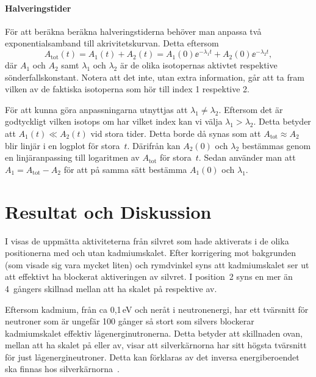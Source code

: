 \documentclass[11pt,a4paper, english, swedish
]{article}
\begin{document}
\paragraph{Halveringstider}
För att beräkna beräkna halveringstiderna behöver man anpassa två exponentialsamband till akrivitetskurvan. Detta eftersom 
\begin{equation}
A_\text{tot}(t) = A_{1}(t) + A_{2}(t) 
= A_{1}(0)\ee^{-\lambda_1 t} + A_{2}(0)\ee^{-\lambda_2 t},
\end{equation}
där $A_1$ och $A_2$ samt $\lambda_1$ och $\lambda_2$ är de olika isotopernas aktivtet respektive sönderfallskonstant. Notera att det inte, utan extra information, går att ta fram vilken av de faktiska isotoperna som hör till index 1 respektive 2. 

För att kunna göra anpassningarna utnyttjas att $\lambda_1\neq\lambda_2$. Eftersom det är godtyckligt vilken isotops om har vilket index kan vi välja $\lambda_1>\lambda_2$. Detta betyder att $A_{1}(t)\ll A_{2}(t)$ vid stora tider. Detta borde då synas som att $A_\text{tot}\approx A_2$ blir linjär i en logplot för stora~$t$. Därifrån kan $A_2(0)$ och $\lambda_2$ bestämmas genom en linjäranpassing till logaritmen av $A_\text{tot}$ för stora~$t$. 
Sedan använder man att $A_1=A_\text{tot}-A_2$ för att på samma sätt bestämma $A_1(0)$ och $\lambda_1$.



\section{Resultat och Diskussion}

I  visas de uppmätta aktiviteterna från silvret som hade aktiverats i de olika positionerna med och utan kadmiumskalet. Efter korrigering mot bakgrunden (som visade sig vara mycket liten) och rymdvinkel syns att kadmiumskalet ser ut att effektivt ha blockerat\footnotemark{} aktiveringen av silvret. I position~2 syns en mer än 4~gångers skillnad mellan att ha skalet på respektive av.

Eftersom kadmium, från ca 0,1\,eV och neråt i neutronenergi, har ett tvärsnitt för neutroner som är ungefär 100 gånger så stort som silvers blockerar kadmiumskalet effektiv lågenerginutronerna. Detta betyder att skillnaden ovan, mellan att ha skalet på eller av, visar att silverkärnorna har sitt högsta tvärsnitt för just lågenergineutroner. Detta kan förklaras av det inversa energiberoendet ska finnas hos silverkärnorna~\cite{labPM}.
\end{document}
